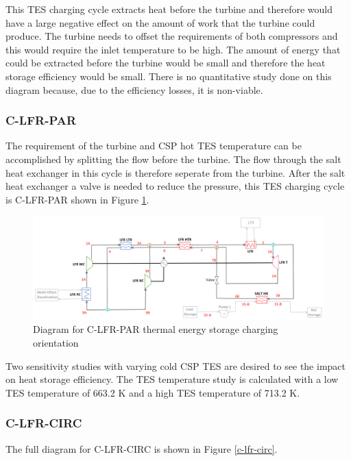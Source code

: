 \begin{paracol}{2}
\linenumbers
\switchcolumn

This TES charging cycle extracts heat before the turbine and therefore would have a large negative effect on the amount of work that the turbine could produce. The turbine needs to offset the requirements of both compressors and this would require the inlet temperature to be high. The amount of energy that could be extracted before the turbine would be small and therefore the heat storage efficiency would be small. There is no quantitative study done on this diagram because, due to the efficiency losses, it is non-viable. 

\subsubsection{C-LFR-PAR} %

The requirement of the turbine and CSP hot TES temperature can be accomplished by splitting the flow before the turbine. The flow through the salt heat exchanger in this cycle is therefore seperate from the turbine. After the salt heat exchanger a valve is needed to reduce the pressure, this TES charging cycle is C-LFR-PAR shown in Figure \ref{c-lfr-par}.

\end{paracol}
\begin{figure}[H]
    \widefigure
    \includegraphics[width=\linewidth]{Definitions/c-lfr-par.pdf}
    \caption{Diagram for C-LFR-PAR thermal energy storage charging orientation\label{c-lfr-par}}
\end{figure}
\begin{paracol}{2}
\linenumbers
\switchcolumn

Two sensitivity studies with varying cold CSP TES are desired to see the impact on heat storage efficiency. The TES temperature study is calculated with a low TES temperature of 663.2 K and a high TES temperature of 713.2 K. 

\subsubsection{C-LFR-CIRC} %

The full diagram for C-LFR-CIRC is shown in Figure \ref{c-lfr-circ}.

\end{paracol}
